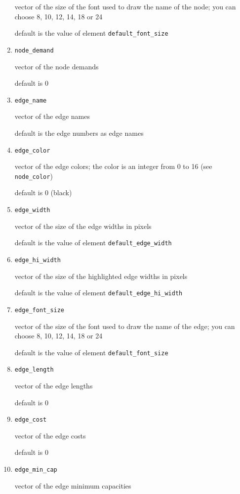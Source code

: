 \documentclass[11pt]{report}
\newcommand{\T}[1]{{\tt #1}}
\begin{document}
\begin{enumerate}
vector of the size of the font used to draw the name of the node; 
you can choose
8, 10, 12, 14, 18 or 24

default is the value of element \T{default\_font\_size}

  \item \T{node\_demand}

vector of the node demands

default is 0

  \item \T{edge\_name}

vector of the edge names

default is the edge numbers as edge names

  \item \T{edge\_color}

vector of the edge colors; 
the color is an integer from 0 to 16 (see \T{node\_color})

default is 0 (black)

  \item \T{edge\_width}

vector of the size of the edge widths in pixels

default is the value of element \T{default\_edge\_width}

  \item \T{edge\_hi\_width}

vector of the size of the highlighted edge widths in pixels

default is the value of element \T{default\_edge\_hi\_width}

  \item \T{edge\_font\_size}

vector of the size of the font used to draw the name of the edge; you
can choose 8, 10, 12, 14, 18 or 24

default is the value of element \T{default\_font\_size}

  \item \T{edge\_length}

vector of the edge lengths

default is 0

  \item \T{edge\_cost}

vector of the edge costs

default is 0

  \item \T{edge\_min\_cap}

vector of the edge minimum capacities


\end{enumerate}
\end{document}
